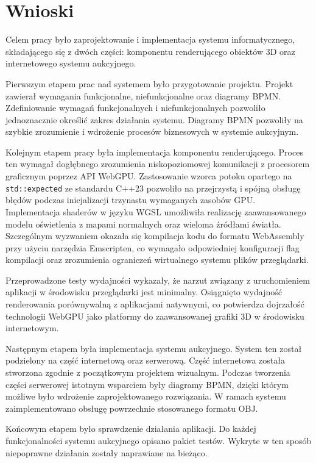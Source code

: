 \section{Wnioski}

Celem pracy było zaprojektowanie i implementacja systemu informatycznego, składającego się z dwóch części: komponentu renderującego obiektów 3D oraz internetowego systemu aukcyjnego.

Pierwszym etapem prac nad systemem było przygotowanie projektu. Projekt zawierał wymagania funkcjonalne, niefunkcjonalne oraz diagramy BPMN. Zdefiniowanie wymagań funkcjonalnych i niefunkcjonalnych pozwoliło jednoznacznie określić zakres działania systemu. Diagramy BPMN pozwoliły na szybkie zrozumienie i wdrożenie procesów biznesowych w systemie aukcyjnym.

Kolejnym etapem pracy była implementacja komponentu renderującego. Proces ten wymagał dogłębnego zrozumienia niskopoziomowej komunikacji z procesorem graficznym poprzez API WebGPU. Zastosowanie wzorca potoku opartego na \texttt{std::expected} ze standardu C++23 pozwoliło na przejrzystą i spójną obsługę błędów podczas inicjalizacji trzynastu wymaganych zasobów GPU. Implementacja shaderów w języku WGSL umożliwiła realizację zaawansowanego modelu oświetlenia z mapami normalnych oraz wieloma źródłami światła. Szczególnym wyzwaniem okazała się kompilacja kodu do formatu WebAssembly przy użyciu narzędzia Emscripten, co wymagało odpowiedniej konfiguracji flag kompilacji oraz zrozumienia ograniczeń wirtualnego systemu plików przeglądarki.

Przeprowadzone testy wydajności wykazały, że narzut związany z uruchomieniem aplikacji w środowisku przeglądarki jest minimalny. Osiągnięto wydajność renderowania porównywalną z aplikacjami natywnymi, co potwierdza dojrzałość technologii WebGPU jako platformy do zaawansowanej grafiki 3D w środowisku internetowym.

Następnym etapem była implementacja systemu aukcyjnego. System ten został podzielony na część internetową oraz serwerową. Część internetowa została stworzona zgodnie z początkowym projektem wizualnym. Podczas tworzenia części serwerowej istotnym wsparciem były diagramy BPMN, dzięki którym możliwe było wdrożenie zaprojektowanego rozwiązania. W ramach systemu zaimplementowano obsługę powrzechnie stosowanego formatu OBJ.

Końcowym etapem było sprawdzenie działania aplikacji. Do każdej funkcjonalności systemu aukcyjnego opisano pakiet testów. Wykryte w ten sposób niepoprawne działania zostały naprawiane na bieżąco.

